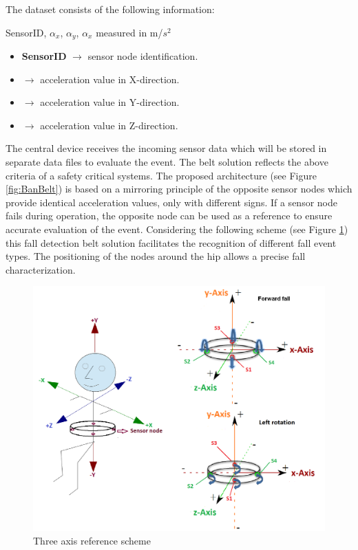 \documentclass[10pt,journal,compsoc]{IEEEtran}
\begin{document}
The dataset consists of the following information: 
\begin{center}
	SensorID, $\alpha_{x}$, $\alpha_{y}$, $\alpha_{x}$ measured in m/$s^2$
\end{center}
\begin{itemize}
	\item \textbf{SensorID} $\rightarrow$ sensor node identification.
	\item {} $\rightarrow$ acceleration value in X-direction.
	\item {} $\rightarrow$ acceleration value in Y-direction.
	\item {} $\rightarrow$ acceleration value in Z-direction.
\end{itemize} 
The central device receives the incoming sensor data which will be stored in separate data files to evaluate the event. 
The belt solution reflects the above criteria of a safety critical systems. The proposed architecture (see Figure \ref{fig:BanBelt}) is based on a mirroring principle of the opposite sensor nodes which provide identical acceleration values, only with different signs. If a sensor node fails during operation, the opposite node can be used as a reference to ensure accurate evaluation of the event.  Considering the following scheme (see Figure \ref{fig:ReferenceScheme}) this fall detection belt solution facilitates the recognition of different fall event types. The positioning of the nodes around the hip allows a precise fall characterization.
\begin{figure}[!ht]
	\centering
	\includegraphics[scale=0.17]{Images/axis.png}
	\caption[Three axis reference scheme]{Three axis reference scheme \cite{LaBlunda.2016,LuigiMasterThesis}}
	\label{fig:ReferenceScheme}
\end{figure}
\end{document}
